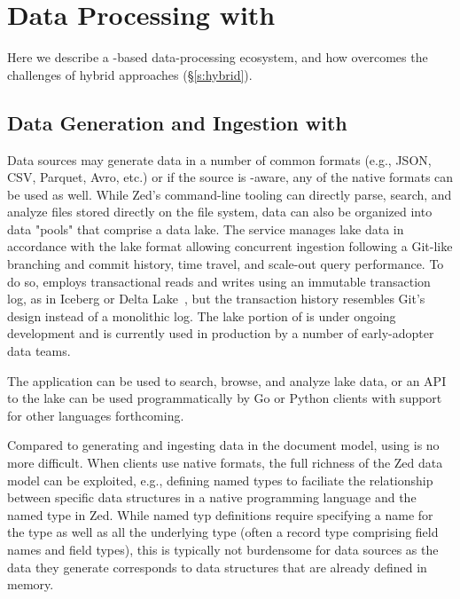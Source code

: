 \vspace{-0.6em}
\section{Data Processing with \sys{}} \label{s:zed_in_action}

Here we describe a \sys{}-based data-processing ecosystem, and how \sys{} overcomes the challenges of hybrid approaches (\S\ref{s:hybrid}).

\vspace{-0.9em}
\subsection{Data Generation and Ingestion with \sys{}}

Data sources may generate data in a number of common formats (e.g., JSON, CSV, Parquet, Avro, etc.) or if the source is \sys{}-aware, any of the native \sys{} formats can be used as well.  While Zed's command-line tooling can directly parse, search, and analyze files stored directly on the file system, \zed{} data can also be organized into data "pools" that comprise a \sys{} data lake.  The \zed{} service manages lake data in accordance with the \sys{} lake format allowing concurrent ingestion following a Git-like branching and commit history, time travel, and scale-out query performance.  To do so, \sys{} employs transactional reads and writes using an immutable transaction log, as in Iceberg or Delta Lake~\cite{delta_lake}, but the transaction history resembles Git's design instead of a monolithic log.  The \sys{} lake portion of \sys{} is under ongoing development and is currently used in production by a number of early-adopter data teams.

The  application can be used to search, browse, and analyze \sys{} lake data, or an API to the lake can be used programmatically by Go or Python clients with support for other languages forthcoming.

Compared to generating and ingesting data in the document model, using \sys{} is no more difficult.  When clients use native \sys{} formats, the full richness of the Zed data model can be exploited, e.g., defining named types to faciliate the relationship between specific data structures in a native programming language and the named type in Zed.  While named typ definitions require specifying a name for the type as well as all the underlying type (often a record type comprising field names and field types), this is typically not burdensome for data sources as the data they generate corresponds to data structures that are already defined in memory.

